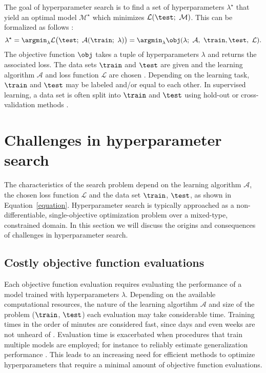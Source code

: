 The goal of hyperparameter search is to find a set of hyperparameters $\lambda^\star$ that yield an optimal model $\mathcal{M}^\star$ which minimizes $\mathcal{L}(\test;\ \mathcal{M})$. This can be formalized as follows \citep{DBLP:journals/corr/ClaesenSPMM14}:
\begin{equation}
\lambda^\star = \argmin_{\lambda} \mathcal{L}\big(\test;\ \mathcal{A}(\train;\ \lambda)\big) = \argmin_{\lambda} \obj(\lambda;\ \mathcal{A},\ \train, \test,\ \mathcal{L}). \label{equation}
\end{equation}
The objective function $\obj$ takes a tuple of hyperparameters $\lambda$ and returns the associated loss. The data sets $\train$ and $\test$ are given and the learning algorithm $\mathcal{A}$ and loss function $\mathcal{L}$ are chosen . Depending on the learning task, $\train$ and $\test$ may be labeled and/or equal to each other. In supervised learning, a data set is often split into $\train$ and $\test$ using hold-out or cross-validation methods \citep{efron1983leisurely,kohavi1995study}.



\section{Challenges in hyperparameter search} \label{challenges}
The characteristics of the search problem depend on the learning algorithm $\mathcal{A}$, the chosen loss function $\mathcal{L}$ and the data set $\train$, $\test$, as shown in Equation~\eqref{equation}. Hyperparameter search is typically approached as a non-differentiable, single-objective optimization problem over a mixed-type, constrained domain. In this section we will discuss the origins and consequences of challenges in hyperparameter search.

\subsection{Costly objective function evaluations} \label{time}
Each objective function evaluation requires evaluating the performance of a model trained with hyperparameters $\lambda$. Depending on the available computational resources, the nature of the learning algortihm $\mathcal{A}$ and size of the problem ($\train$, $\test$) each evaluation may take considerable time. Training times in the order of minutes are considered fast, since days and even weeks are not unheard of \citep{krizhevsky2012imagenet, dean2012large, sutskever2014sequence}. Evaluation time is exacerbated when procedures that train multiple models are employed; for instance to reliably estimate generalization performance \citep{efron1983leisurely,kohavi1995study}. This leads to an increasing need for efficient methods to optimize hyperparameters that require a minimal amount of objective function evaluations.

